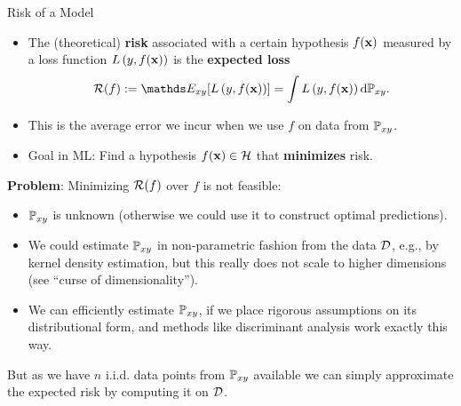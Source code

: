 \documentclass[11pt,compress,t,notes=noshow, xcolor=table]{beamer}
\begin{document}
\begin{vbframe}{Risk of a Model}

\begin{itemize}
  \item The (theoretical) \textbf{risk} associated with a certain hypothesis $f(\mathbf{x})$ measured by a loss function $L\left(y, f(\mathbf{x})\right)$ is the \textbf{expected loss}
  $$ \riskf := \E_{xy} [\Lxy] = \int \Lxy \text{d}\Pxy. $$
  \item This is the average error we incur when we use $f$ on data from $\mathbb{P}_{xy}$.
  \item Goal in ML: Find a hypothesis $f(\mathbf{x}) \in \mathcal{H}$ that \textbf{minimizes} risk.
\end{itemize}

\framebreak


\textbf{Problem}: Minimizing $\mathcal{R}(f)$ over $f$ is not feasible:

\begin{itemize}
\item $\mathbb{P}_{xy}$ is unknown (otherwise we could use it to construct optimal predictions).
\item We could estimate $\mathbb{P}_{xy}$ in non-parametric fashion from the data $\mathcal{D}$, e.g., by kernel density estimation, but this really does not scale to higher dimensions (see \enquote{curse of dimensionality}).
\item We can efficiently estimate $\mathbb{P}_{xy}$, if we place rigorous assumptions on its distributional form, and methods like discriminant analysis work exactly this way. 
\end{itemize}

\lz

But as we have $n$ i.i.d. data points from $\mathbb{P}_{xy}$ available we can simply
approximate the expected risk by computing it on $\mathcal{D}$.

\end{vbframe}
\end{document}
